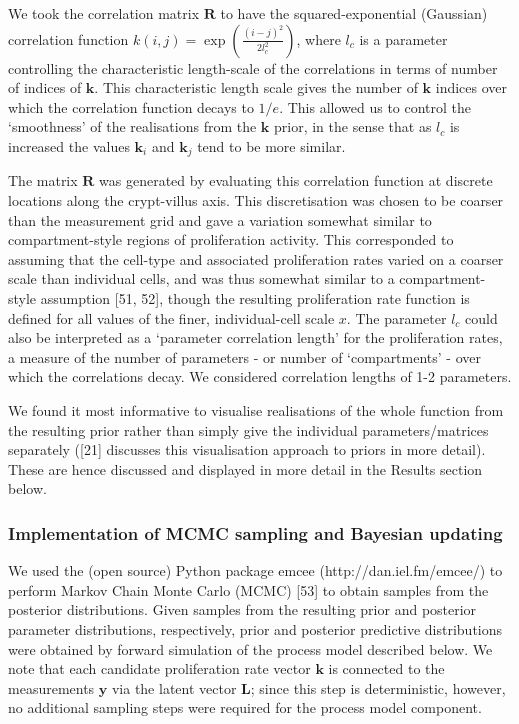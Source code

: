 \documentclass[10pt,letterpaper]{article}
\begin{document}
We took the correlation matrix \(\mathbf{R}\) to have the
squared-exponential (Gaussian) correlation function
\(k(i,j) = \exp(\frac{(i-j)^2}{2l_c^2})\), where \(l_c\) is a parameter
controlling the characteristic length-scale of the correlations in terms
of number of indices of \(\mathbf{k}\). This characteristic length scale
gives the number of \(\mathbf{k}\) indices over which the correlation
function decays to \(1/e\). This allowed us to control the `smoothness'
of the realisations from the \(\mathbf{k}\) prior, in the sense that as
\(l_c\) is increased the values \(\mathbf{k}_i\) and \(\mathbf{k}_j\)
tend to be more similar.

The matrix \(\mathbf{R}\) was generated by evaluating this correlation
function at discrete locations along the crypt-villus axis. This
discretisation was chosen to be coarser than the measurement grid and
gave a variation somewhat similar to compartment-style regions of
proliferation activity. This corresponded to assuming that the cell-type
and associated proliferation rates varied on a coarser scale than
individual cells, and was thus somewhat similar to a compartment-style
assumption {[}51, 52{]}, though the resulting proliferation rate
function is defined for all values of the finer, individual-cell scale
\(x\). The parameter \(l_c\) could also be interpreted as a `parameter
correlation length' for the proliferation rates, a measure of the number
of parameters - or number of `compartments' - over which the
correlations decay. We considered correlation lengths of 1-2 parameters.

We found it most informative to visualise realisations of the whole
function from the resulting prior rather than simply give the individual
parameters/matrices separately ({[}21{]} discusses this visualisation
approach to priors in more detail). These are hence discussed and
displayed in more detail in the Results section below.


\subsubsection{Implementation of MCMC sampling and Bayesian
updating}\label{implementation-of-mcmc-sampling-and-bayesian-updating}

We used the (open source) Python package emcee
(http://dan.iel.fm/emcee/) to perform Markov Chain Monte Carlo (MCMC)
{[}53{]} to obtain samples from the posterior distributions. Given
samples from the resulting prior and posterior parameter distributions,
respectively, prior and posterior predictive distributions were obtained
by forward simulation of the process model described below. We note that
each candidate proliferation rate vector \(\mathbf{k}\) is connected to
the measurements \(\mathbf{y}\) via the latent vector \(\mathbf{L}\);
since this step is deterministic, however, no additional sampling steps
were required for the process model component.
\end{document}
